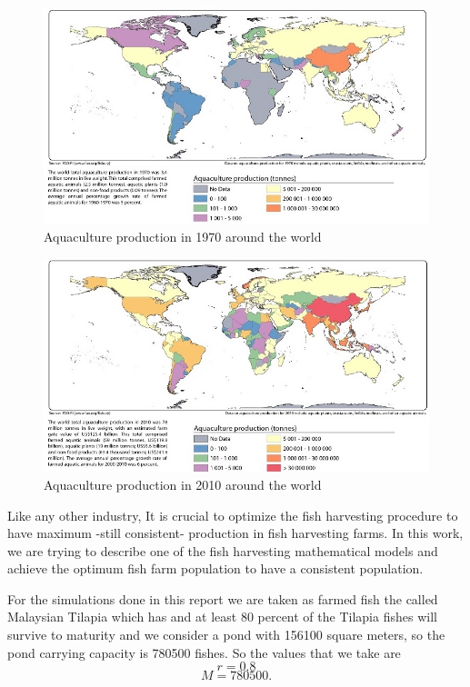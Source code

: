 \begin{figure}[H]
	\includegraphics[width=\textwidth]{1970.jpeg}
	\caption{Aquaculture production in 1970 around the world}
\end{figure}
\label{fig1.3} 

\begin{figure}[H]
	\includegraphics[width=\textwidth]{2010.jpeg}
	\caption{Aquaculture production in 2010 around the world}
\end{figure}
\label{fig1.4} 

Like any other industry, It is crucial to optimize the fish harvesting procedure to have maximum -still consistent- production in fish harvesting farms. In this work, we are trying to describe one of the fish harvesting mathematical models and achieve the optimum fish farm population to have a consistent population.

For the simulations done in this report we are taken as farmed fish the called Malaysian Tilapia which has and at least 80 percent of the Tilapia fishes will survive to maturity and we consider a pond with 156100 square meters, so the pond carrying capacity is 780500 fishes. So the values that we take are 
$$r=0.8$$
$$M=780500.$$